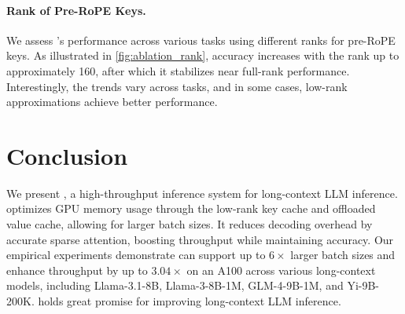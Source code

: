 \paragraph{Rank of Pre-RoPE Keys.} We assess \Sys's performance across various tasks using different ranks for pre-RoPE keys. As illustrated in \cref{fig:ablation_rank}, accuracy increases with the rank up to approximately 160, after which it stabilizes near full-rank performance. Interestingly, the trends vary across tasks, and in some cases, low-rank approximations achieve better performance.

\section{Conclusion}
We present \Sys, a high-throughput inference system for long-context LLM inference. \Sys optimizes GPU memory usage through the low-rank key cache and offloaded value cache, allowing for larger batch sizes. It reduces decoding overhead by accurate sparse attention, boosting throughput while maintaining accuracy. Our empirical experiments demonstrate \Sys can support up to $6\times$ larger batch sizes and enhance throughput by up to $3.04\times$ on an A100 across various long-context models, including Llama-3.1-8B, Llama-3-8B-1M, GLM-4-9B-1M, and Yi-9B-200K. \Sys holds great promise for improving long-context LLM inference.

\newpage


